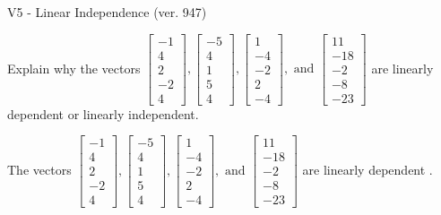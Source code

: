 \begin{exercise}
  \begin{exerciseTitle}V5 - Linear Independence (ver. 947)\end{exerciseTitle}
  \begin{exerciseStatement}
    Explain why the vectors \(\left[\begin{array}{r}
-1 \\
4 \\
2 \\
-2 \\
4
\end{array}\right] , \left[\begin{array}{r}
-5 \\
4 \\
1 \\
5 \\
4
\end{array}\right] , \left[\begin{array}{r}
1 \\
-4 \\
-2 \\
2 \\
-4
\end{array}\right] , \text{ and } \left[\begin{array}{r}
11 \\
-18 \\
-2 \\
-8 \\
-23
\end{array}\right]\) are linearly dependent or linearly independent.	


  \end{exerciseStatement}
  \begin{exerciseAnswer}
   The vectors \(\left[\begin{array}{r}
-1 \\
4 \\
2 \\
-2 \\
4
\end{array}\right] , \left[\begin{array}{r}
-5 \\
4 \\
1 \\
5 \\
4
\end{array}\right] , \left[\begin{array}{r}
1 \\
-4 \\
-2 \\
2 \\
-4
\end{array}\right] , \text{ and } \left[\begin{array}{r}
11 \\
-18 \\
-2 \\
-8 \\
-23
\end{array}\right]\) are 
  	 linearly dependent  .
  


  \end{exerciseAnswer}
\end{exercise}
